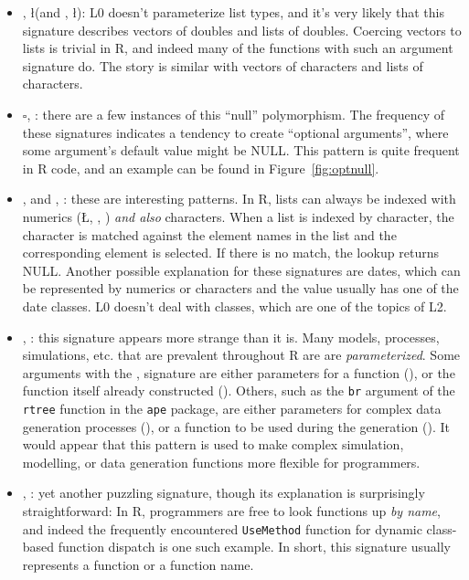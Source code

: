 \documentclass[acmsmall,10pt,review,anonymous]{acmart}\settopmatter{printfolios=true,printccs=false,printacmref=false}
\begin{document}
\begin{itemize}

	\item \D, \l (and \C, \l): L0 doesn't parameterize list types, and it's very likely that this signature describes vectors of doubles and lists of doubles.
	Coercing vectors to lists is trivial in R, and indeed many of the functions with such an argument signature do.
	The story is similar with vectors of characters and lists of characters.
	
	\item $\square$, \sN: there are a few instances of this ``null'' polymorphism.
	The frequency of these signatures indicates a tendency to create ``optional arguments'', where some argument's default value might be NULL.
	This pattern is quite frequent in R code, and an example can be found in Figure~\ref{fig:optnull}.

	\item \C, \D and \C, \I: these are interesting patterns.
	In R, lists can always be indexed with numerics (\L, \D, \I) {\it and also} characters.
	When a list is indexed by character, the character is matched against the element names in the list and the corresponding element is selected.
	If there is no match, the lookup returns NULL.
	Another possible explanation for these signatures are dates, which can be represented by numerics or characters and the value usually has one of the date classes.
	L0 doesn't deal with classes, which are one of the topics of L2.

	\item \D, \sF: this signature appears more strange than it is.
	Many models, processes, simulations, etc. that are prevalent throughout R are are {\it parameterized}.
	Some arguments with the \D, \sF signature are either parameters for a function (\D), or the function itself already constructed (\sF).
	Others, such as the {\tt br} argument of the {\tt rtree} function in the {\tt ape} package, are either parameters for complex data generation processes (\D), or a function to be used during the generation (\sF).
	It would appear that this pattern is used to make complex simulation, modelling, or data generation functions more flexible for programmers.
	
	\item \C, \sF: yet another puzzling signature, though its explanation is surprisingly straightforward:
	In R, programmers are free to look functions up {\it by name}, and indeed the frequently encountered {\tt UseMethod} function for dynamic class-based function dispatch is one such example.
	In short, this signature usually represents a function or a function name.

\end{itemize}
\end{document}
